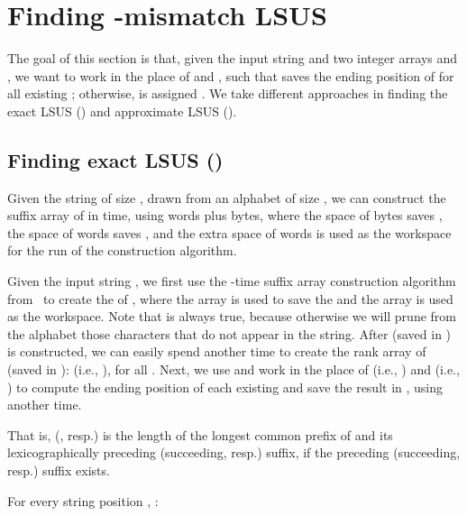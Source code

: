 \documentclass[11pt]{llncs}
\begin{document}
\section{Finding -mismatch LSUS}
\label{sec:lsus} 
The goal of this section is that, given the input string  and two
integer arrays  and , we want to work in the place of  and
, such that  saves the ending position of 
 for all existing ;
otherwise,  is assigned .
We take different approaches in finding 
the exact LSUS () and approximate LSUS (). 



\subsection{Finding exact LSUS ()}
\label{sec:lsus-0}

\begin{lemma}
\label{lem:sa}
Given the string  of size , drawn from an alphabet of
size , we can construct the suffix array  of  in
 time, using  words plus  bytes, where the space of
 bytes saves , the space of  words saves , and the extra
space of  words is used as the workspace for the run of the
 construction algorithm.
\end{lemma}

Given the input string , we first use the -time suffix array
construction algorithm from~\cite{Nong-TIS2013} to create the  of
, where the array  is used to save the  and the array 
is used as the workspace. Note that  is always true,
because otherwise we will prune from the alphabet those characters
that do not appear in the string.
After  (saved in ) is constructed, we can easily spend
another  time to create the rank array  of  (saved in
):  (i.e., ), for all .
Next, we use and work in the place of   (i.e., ) and
 (i.e., ) to compute the ending position of each existing
 and save the result in , using another 
time. 

\begin{definition}
\label{def:hl}


That is,  (, resp.) is the length of the longest
common prefix of 
and its lexicographically preceding (succeeding, resp.)
suffix, if the preceding (succeeding, resp.) suffix exists. 
\end{definition}


\begin{fact}
\label{fact:lsus-length}
For every string position ,  : 

\end{fact}
\end{document}
